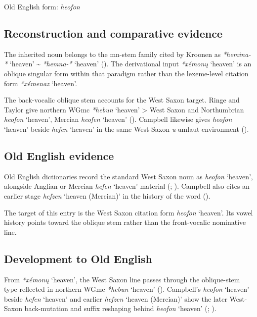 \documentclass[
  british,
  a4paper,
  openany]{book}
\providecommand{\Recon}[1]{\emph{*#1}}
{\catcode`→=\active \global\def→{\ensuremath{\rightarrow}}}
\providecommand{\Recon}[1]{\emph{*#1}}
{\catcode`→=\active \global\def→{\ensuremath{\rightarrow}}}
\begin{document}
Old English form: \emph{heofon}

\subsection{Reconstruction and comparative
evidence}\label{reconstruction-and-comparative-evidence-116}

The inherited noun belongs to the mn-stem family cited by Kroonen as
{\Recon{hemina-*} `heaven'} \textasciitilde{} {\Recon{hemna-*} `heaven'}
(). The derivational input
{\Recon{xémonų} `heaven'} is an oblique singular form within that
paradigm rather than the lexeme-level citation form {\Recon{xémenaz}
`heaven'}.

The back-vocalic oblique stem accounts for the West Saxon target. Ringe
and Taylor give northern WGmc {\Recon{hebun} `heaven'} \textgreater{}
West Saxon and Northumbrian {\emph{heofon}} `heaven', Mercian
{\emph{heofen}} `heaven' (). Campbell likewise gives {\emph{heofon}} `heaven'
beside {\emph{hefen}} `heaven' in the same West-Saxon \emph{u}-umlaut
environment ().

\subsection{Old English evidence}\label{old-english-evidence-116}

Old English dictionaries record the standard West Saxon noun as
{\emph{heofon}} `heaven', alongside Anglian or Mercian {\emph{hefen}}
`heaven' material (;
).
Campbell also cites an earlier stage {\emph{hefzen}} `heaven (Mercian)'
in the history of the word ().

The target of this entry is the West Saxon citation form {\emph{heofon}}
`heaven'. Its vowel history points toward the oblique stem rather than
the front-vocalic nominative line.

\subsection{Development to Old
English}\label{development-to-old-english-116}

From {\Recon{xémonų} `heaven'}, the West Saxon line passes through the
oblique-stem type reflected in northern WGmc {\Recon{hebun} `heaven'}
(). Campbell's
{\emph{heofon}} `heaven' beside {\emph{hefen}} `heaven' and earlier
{\emph{hefzen}} `heaven (Mercian)' show the later West-Saxon
back-mutation and suffix reshaping behind {\emph{heofon}} `heaven'
(;
).
\end{document}
